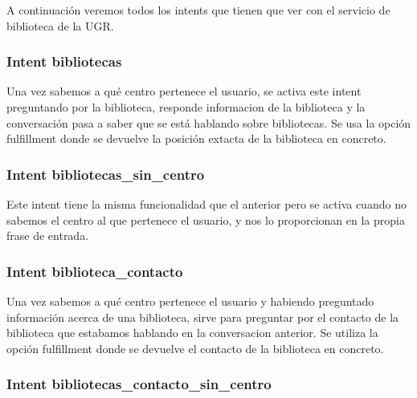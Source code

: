 \vspace{5 mm}

A continuación veremos todos los intents que tienen que ver con el servicio de biblioteca de la UGR.

\vspace{5 mm}

\subsubsection{Intent bibliotecas}

\vspace{5 mm}

Una vez sabemos a qué centro pertenece el usuario, se activa este intent preguntando por la biblioteca, responde informacion de la biblioteca y la conversación pasa a saber que se está hablando sobre bibliotecas. Se usa la opción fulfillment donde se devuelve la posición extacta de la biblioteca en concreto.

\vspace{5 mm}


\subsubsection{Intent bibliotecas_sin_centro}

Este intent tiene la misma funcionalidad que el anterior pero se activa cuando no sabemos el centro al que pertenece el usuario, y nos lo proporcionan en la propia frase de entrada.


\vspace{5 mm}

\subsubsection{Intent biblioteca_contacto}

\vspace{5 mm}

Una vez sabemos a qué centro pertenece el usuario y habiendo preguntado información acerca de una biblioteca, sirve para preguntar por el contacto de la biblioteca que estabamos hablando en la conversacion anterior. Se utiliza la opción fulfillment donde se devuelve el contacto de la biblioteca en concreto.

\vspace{5 mm}

\subsubsection{Intent bibliotecas_contacto_sin_centro}

